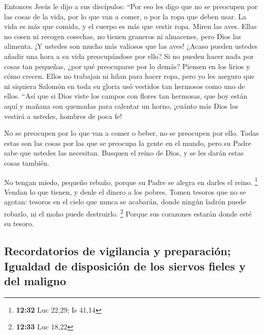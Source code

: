  Entonces Jesús le dijo a sus discípulos: ``Por eso les
digo que no se preocupen por las cosas de la vida, por lo que van a
comer, o por la ropa que deben usar.  La vida es más que
comida, y el cuerpo es más que vestir ropa.  Miren las
aves. Ellas no cosen ni recogen cosechas, no tienen graneros ni
almacenes, pero Dios las alimenta. ¡Y ustedes son mucho más valiosos que
las aves!  ¿Acaso pueden ustedes añadir una hora a su
vida preocupándose por ello?  Si no pueden hacer nada por
cosas tan pequeñas, ¿por qué preocuparse por lo demás? 
Piensen en los lirios y cómo crecen. Ellos no trabajan ni hilan para
hacer ropa, pero yo les aseguro que ni siquiera Salomón en toda su
gloria usó vestidos tan hermosos como uno de ellos. 
``Así que si Dios viste los campos con flores tan hermosas, que hoy
están aquí y mañana son quemadas para calentar un horno, ¡cuánto más
Dios los vestirá a ustedes, hombres de poca fe!

 No se preocupen por lo que van a comer o beber, no se
preocupen por ello.  Todas estas son las cosas por las
que se preocupa la gente en el mundo, pero su Padre sabe que ustedes las
necesitan.  Busquen el reino de Dios, y se les darán
estas cosas también.

 No tengan miedo, pequeño rebaño, porque su Padre se
alegra en darles el reino. \footnote{\textbf{12:32} Luc 22,29; Is 41,14}
 Vendan lo que tienen, y denle el dinero a los pobres.
Tomen tesoros que no se agotan: tesoros en el cielo que nunca se
acabarán, donde ningún ladrón puede robarlo, ni el moho puede
destruirlo. \footnote{\textbf{12:33} Luc 18,22}  Porque
sus corazones estarán donde esté su tesoro.

\hypertarget{recordatorios-de-vigilancia-y-preparaciuxf3n-igualdad-de-disposiciuxf3n-de-los-siervos-fieles-y-del-maligno}{%
\subsection{Recordatorios de vigilancia y preparación; Igualdad de
disposición de los siervos fieles y del
maligno}\label{recordatorios-de-vigilancia-y-preparaciuxf3n-igualdad-de-disposiciuxf3n-de-los-siervos-fieles-y-del-maligno}}


